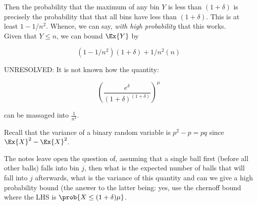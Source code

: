 \documentclass[../main.tex]{subfiles}
\begin{document}
\begin{example}
    Then the probability that the maximum of any bin $Y$ is less than $(1 + \delta)$ is precisely the probability that that all bins have less than $(1 + \delta)$. This is at least $1 - 1/n^2$. Whence, we can say, \textit{with high probability} that this works. \\

    Given that $Y \leq n$, we can bound $\Ex{Y}$ by

    \[
        (1 - 1/n^2)(1 + \delta) + 1/n^2(n)
    \]

    UNRESOLVED: It is not known how the quantity:

    \[
        \left( \frac{e^{\delta}}{(1 + \delta)^{(1 + \delta)}} \right)^{\mu}
    \]

    can be massaged into $\frac{1}{n^3}$.
\end{example}

\begin{remark}
    Recall that the variance of a binary random variable is $p^2 - p = pq$ since $\Ex{ X }^2 - \Ex{ X }^2$.
    
    The notes leave open the question of, assuming that
    a single ball first (before all other balls) falls into bin $j$, then what is the expected number of balls
    that will fall into $j$ afterwards, what is the variance of this quantity and can we give a high probability bound (the answer to the latter being: yes, use the chernoff bound where the LHS is $\prob{X \leq (1 + \delta) \mu}$.
\end{remark}
\end{document}

